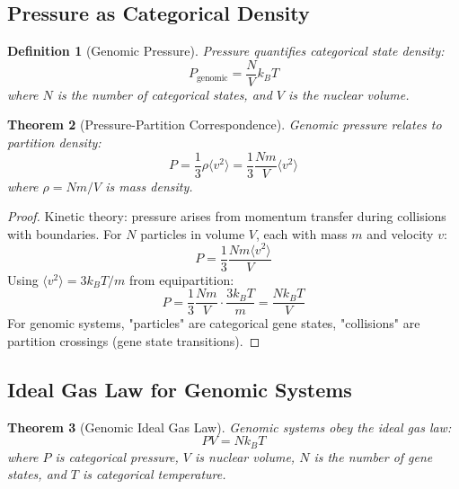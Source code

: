 \documentclass[11pt,a4paper]{article}
\newtheorem{theorem}{Theorem}[section]
\newtheorem{definition}[theorem]{Definition}
\theoremstyle{remark}
\begin{document}
\subsection{Pressure as Categorical Density}

\begin{definition}[Genomic Pressure]
\label{def:genomic_pressure}
Pressure quantifies categorical state density:
\begin{equation}
P_{\text{genomic}} = \frac{N}{V}k_BT
\end{equation}
where $N$ is the number of categorical states, and $V$ is the nuclear volume.
\end{definition}

\begin{theorem}[Pressure-Partition Correspondence]
\label{thm:pressure_partition}
Genomic pressure relates to partition density:
\begin{equation}
P = \frac{1}{3}\rho\langle v^2\rangle = \frac{1}{3}\frac{N m}{V}\langle v^2\rangle
\end{equation}
where $\rho = Nm/V$ is mass density.
\end{theorem}

\begin{proof}
Kinetic theory: pressure arises from momentum transfer during collisions with boundaries. For $N$ particles in volume $V$, each with mass $m$ and velocity $v$:
\begin{equation}
P = \frac{1}{3}\frac{N m\langle v^2\rangle}{V}
\end{equation}
Using $\langle v^2\rangle = 3k_BT/m$ from equipartition:
\begin{equation}
P = \frac{1}{3}\frac{N m}{V} \cdot \frac{3k_BT}{m} = \frac{Nk_BT}{V}
\end{equation}
For genomic systems, "particles" are categorical gene states, "collisions" are partition crossings (gene state transitions).
\end{proof}

\subsection{Ideal Gas Law for Genomic Systems}

\begin{theorem}[Genomic Ideal Gas Law]
\label{thm:genomic_ideal_gas}
Genomic systems obey the ideal gas law:
\begin{equation}
PV = Nk_BT
\end{equation}
where $P$ is categorical pressure, $V$ is nuclear volume, $N$ is the number of gene states, and $T$ is categorical temperature.
\end{theorem}
\end{document}
